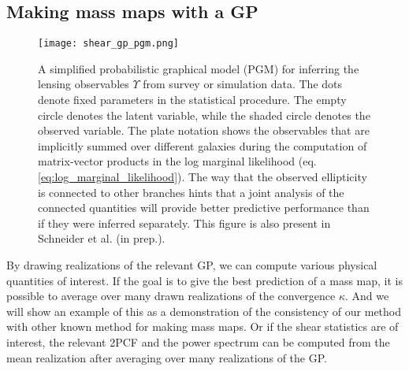 \subsection{Making mass maps with a GP}
\begin{figure}
	\centering
	\texttt{[image: shear\_gp\_pgm.png]}
	\caption{A simplified probabilistic graphical model (PGM) for inferring
		the lensing observables $\Upsilon$ from survey or simulation data. The dots
		denote fixed parameters in the statistical procedure. The empty circle denotes
		the latent variable, while the shaded circle denotes 
		the observed variable. The plate notation shows the observables that are
		implicitly summed over different galaxies during the computation of matrix-vector
		products in the log marginal likelihood (eq. \ref{eq:log_marginal_likelihood}). The way that the observed
		ellipticity is connected to other branches hints that a joint analysis of
		the connected quantities will provide better predictive performance than if
		they were inferred separately. This figure is also present in Schneider et
		al. (in prep.).
		\label{fig:simplified_pgm}}
\end{figure}

By drawing realizations of the relevant GP, we can compute various 
physical quantities of interest. If the goal is to give the best prediction of a
mass map, it is possible to average over many drawn realizations of the
convergence $\kappa$. And we will show an example of this as a demonstration of
the consistency of our method with other known method for making mass maps.
Or if the shear statistics are of interest, the relevant 2PCF and the power
spectrum can be computed from the mean realization 
after averaging over many realizations of the GP.


